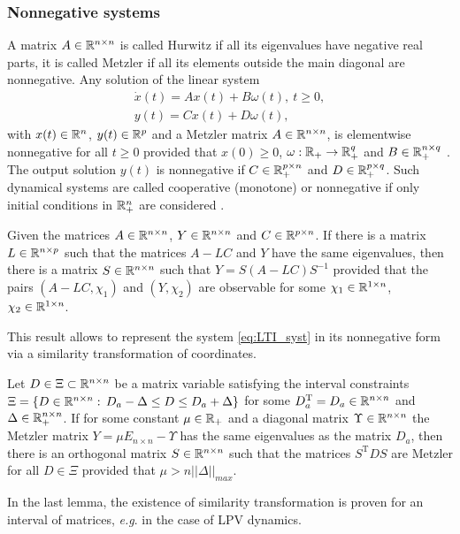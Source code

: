 \subsubsection{Nonnegative systems}

A matrix $A\in\mathbb{R}^{n\times n}$ is called Hurwitz if all its eigenvalues have negative real parts, it is called Metzler if all its elements outside the main diagonal are nonnegative. Any solution of the linear system
\begin{gather}
\dot{x}(t)=Ax(t)+B\omega(t),\:t\geq0,\label{eq:LTI_syst}\\
y(t)=Cx(t)+D\omega(t),\nonumber 
\end{gather}
with $x(t)\in\mathbb{R}^{n}$, $y(t)\in\mathbb{R}^{p}$ and a Metzler matrix $A\in\mathbb{R}^{n\times n}$, is elementwise nonnegative for all $t\ge0$ provided that $x(0)\ge0$, $\omega:\mathbb{R}_{+}\to\mathbb{R}_{+}^{q}$ and $B\in\mathbb{R}_{+}^{n\times q}$ \cite{FarinaRinaldi2000,Smith95}. The output solution $y(t)$ is nonnegative if $C\in\mathbb{R}_{+}^{p\times n}$ and $D\in\mathbb{R}_{+}^{p\times q}$. Such dynamical systems are called cooperative (monotone) or nonnegative if only initial conditions in $\mathbb{R}_{+}^{n}$ are considered \cite{FarinaRinaldi2000,Smith95}.
\begin{lemma}
	\label{lem:l2}\textup{\cite{REZ11}} Given the matrices $A\in\mathbb{R}^{n\times n}$, $Y\in\mathbb{R}^{n\times n}$ and \textup{$C\in\mathbb{R}^{p\times n}$. }If there is a matrix \textup{$L\in\mathbb{R}^{n\times p}$} such that the matrices $A-LC$ and $Y$ have the same eigenvalues, then there is a matrix $S\in\mathbb{R}^{n\times n}$ such that $Y=S(A-LC)S^{-1}$ provided that the pairs $(A-LC,\chi_{1})$ and $(Y,\chi_{2})$ are observable for some $\chi_{1}\in\mathbb{R}^{1\times n}$, $\chi_{2}\in\mathbb{R}^{1\times n}$.\textup{ }
\end{lemma}
This result allows to represent the system \eqref{eq:LTI_syst} in its nonnegative form via a similarity transformation of coordinates.
\begin{lemma}
	\label{lem:l3}\textup{\cite{Efimov_a2013}} Let $D\in\Xi\subset\mathbb{R}^{n\times n}$ be a matrix variable satisfying the interval constraints $\Xi=\{D\in\mathbb{R}^{n\times n}:\,D_{a}-\Delta\le D\le D_{a}+\Delta\}$ for some $D_{a}^{\text{T}}=D_{a}\in\mathbb{R}^{n\times n}$ and $\Delta\in\mathbb{R}_{+}^{n\times n}$. If for some constant $\mu\in\mathbb{R}_{+}$ and a diagonal matrix $\Upsilon\in\mathbb{R}^{n\times n}$ the Metzler matrix $Y=\mu E_{n\times n}-\Upsilon$ has the same eigenvalues as the matrix $D_{a}$, then there is an orthogonal matrix $S\in\mathbb{R}^{n\times n}$ such that the matrices $S^{\text{T}}DS$ are Metzler for all $D\in\Xi$ provided that $\mu>n||\Delta||_{max}$.\textup{ }
\end{lemma}
In the last lemma, the existence of similarity transformation is proven for an interval of matrices, \emph{e.g}. in the case of LPV dynamics.

